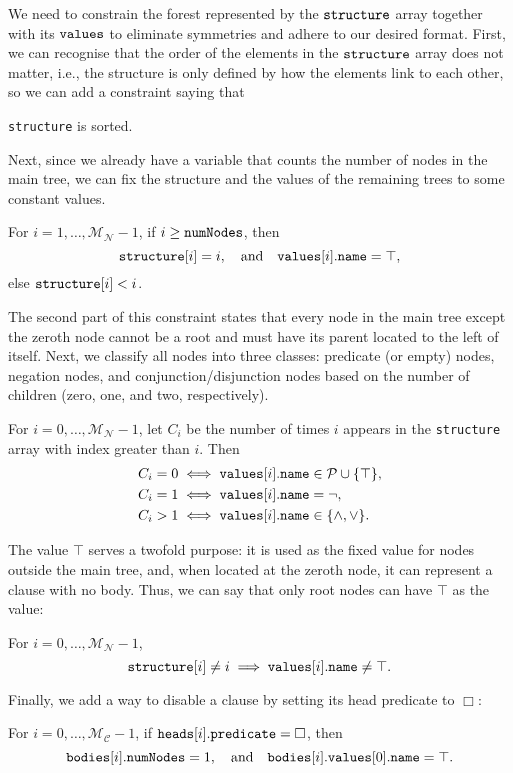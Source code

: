 \documentclass[runningheads]{llncs}
\newcommand{\variable}[1]{\texttt{\textup{#1}}}
\newcommand{\predicates}{\mathcal{P}}
\newcommand{\maxNumNodes}{\mathcal{M}_{\mathcal{N}}}
\newcommand{\maxNumClauses}{\mathcal{M}_{\mathcal{C}}}
\begin{document}
We need to constrain the forest represented by the $\variable{structure}$
array together with its $\variable{values}$ to eliminate symmetries and adhere
to our desired format. First, we can recognise that the order of the elements in
the $\variable{structure}$ array does not matter, i.e., the structure is only
defined by how the elements link to each other, so we can add a constraint
saying that
\begin{constraint}
  \variable{structure} is sorted.
\end{constraint}
Next, since we already have a variable that counts the number of nodes in the
main tree, we can fix the structure and the values of the remaining trees to
some constant values.
\begin{constraint}
  For $i = 1, \dots, \maxNumNodes{} - 1$, if $i \ge \variable{numNodes}$, then
  \[
    \variable{structure}[i] = i, \quad \text{and} \quad
    \variable{values}[i].\variable{name} = \top,
  \]
  else $\variable{structure}[i] < i$.
\end{constraint}
The second part of this constraint states that every node in the main tree
except the zeroth node cannot be a root and must have its parent located to
the left of itself. Next, we classify all nodes into three classes: predicate
(or empty) nodes, negation nodes, and conjunction/disjunction nodes based on the
number of children (zero, one, and two, respectively).
\begin{constraint} \label{constraint:node_types}
  For $i = 0, \dots, \maxNumNodes{} - 1$, let $C_i$ be the number of times $i$
  appears in the \variable{structure} array with index greater than $i$. Then
  \begin{align*}
    C_i = 0 &\iff \variable{values}[i].\variable{name} \in \predicates{} \cup \{ \top \},\\
    C_i = 1 &\iff \variable{values}[i].\variable{name} = \neg,\\
    C_i > 1 &\iff \variable{values}[i].\variable{name} \in \{ \land, \lor \}.
  \end{align*}
\end{constraint}
The value $\top$ serves a twofold purpose: it is used as the fixed value for
nodes outside the main tree, and, when located at the zeroth node, it can
represent a clause with no body. Thus, we can say that only root nodes can have
$\top$ as the value:
\begin{constraint}
  For $i = 0, \dots, \maxNumNodes{} - 1$,
  \[
    \variable{structure}[i] \ne i \implies
    \variable{values}[i].\variable{name} \ne \top.
  \]
\end{constraint}
Finally, we add a way to disable a clause by setting its head predicate to
$\Box$:
\begin{constraint}
  For $i = 0, \dots, \maxNumClauses{} - 1$, if
  $\variable{heads}[i].\variable{predicate} = \Box$, then
  \[
    \variable{bodies}[i].\variable{numNodes} = 1, \quad \text{and}
    \quad \variable{bodies}[i].\variable{values}[0].\variable{name} = \top.
  \]
\end{constraint}
\end{document}
